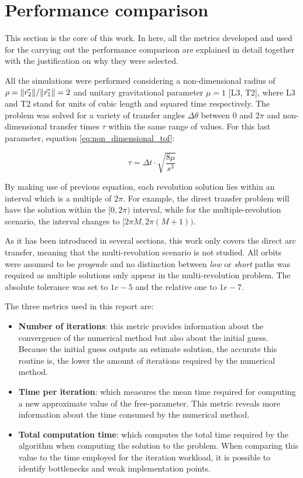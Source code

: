 \section{Performance comparison}

This section is the core of this work. In here, all the metrics developed and
used for the carrying out the performance comparison are explained in detail
together with the justification on why they were selected.

All the simulations were performed considering a non-dimensional radius of
$\rho=\lVert\vec{r_2}\rVert/\lVert\vec{r_1}\rVert=2$ and unitary gravitational parameter
$\mu=1$ [L3, T2], where L3 and T2 stand for units of cubic length and squared
time respectively. The problem was solved for a variety of transfer angles
$\Delta \theta$ between $0$ and $2\pi$ and non-dimensional transfer times $\tau$
within the same range of values. For this last parameter, equation
\ref{eq:non_dimensional_tof}:

\begin{equation}
  \tau =  \Delta t \cdot \sqrt{\frac{8\mu}{s^3}}
  \label{eq:non_dimensional_tof}
\end{equation}

By making use of previous equation, each revolution solution lies within an
interval which is a multiple of $2\pi$. For example, the direct transfer problem
will have the solution within the $[0, 2\pi)$ interval, while for the
multiple-revolution scenario, the interval changes to $[2\pi M, 2\pi(M+1))$.

As it has been introduced in several sections, this work only covers the direct
arc transfer, meaning that the multi-revolution scenario is not studied. All
orbits were assumed to be \textit{prograde} and no distinction between
\textit{low} or \textit{short} paths was required as multiple solutions only
appear in the multi-revolution problem. The absolute tolerance was set to $1e-5$
and the relative one to $1e-7$.

The three metrics used in this report are:

\begin{itemize}
  \item \textbf{Number of iterations}: this metric provides information about
        the convergence of the numerical method but also about the initial
        guess. Because the initial guess outputs an estimate solution, the
        accurate this routine is, the lower the amount of iterations required
        by the numerical method.
  \item \textbf{Time per iteration}: which measures the mean time required for
        computing a new approximate value of the free-parameter. This metric
        reveals more information about the time consumed by the numerical
        method.
  \item \textbf{Total computation time}: which computes the total time required
	by the algorithm when computing the solution to the problem. When
	comparing this value to the time employed for the iteration workload, it
	is possible to identify bottlenecks and weak implementation points.
\end{itemize}

